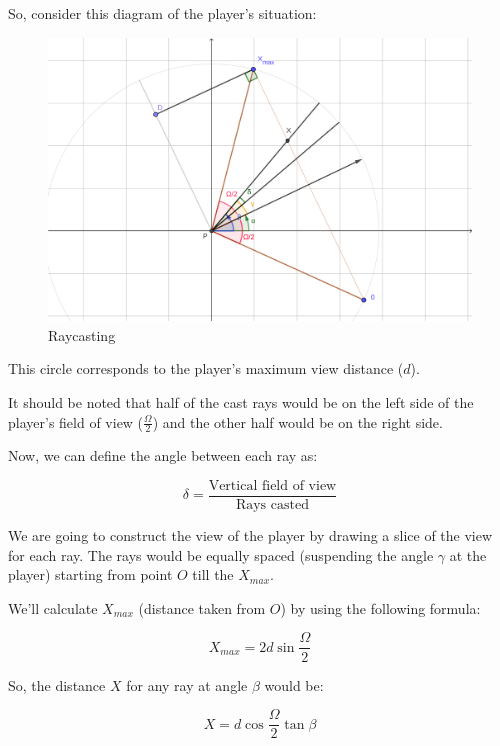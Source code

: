 So, consider this diagram of the player's situation:

\begin{figure}[!ht]
    \centering
    \includegraphics[width=\textwidth]{./images/raycasting.png}
    \caption{Raycasting}
    \label{fig:rays}
\end{figure}

This circle corresponds to the player's maximum view distance ($d$).

It should be noted that half of the cast rays would be on the left side of the player's field of view ($\frac{\Omega}{2}$) and the other half would be on the right side.

Now, we can define the angle between each ray as:

\begin{equation}
    \delta = \frac{\text{Vertical field of view}}{\text{Rays casted}}
\end{equation}

We are going to construct the view of the player by drawing a slice of the view for each ray. The rays would be equally spaced (suspending the angle $\gamma$ at the player) starting from point $O$ till the $X_{max}$.

We'll calculate $X_{max}$ (distance taken from $O$) by using the following formula:

\begin{equation}
    X_{max} = 2 d \sin\frac{\Omega}{2}
\end{equation}

So, the distance $X$ for any ray at angle $\beta$ would be:

\begin{equation}
    X = d \cos\frac{\Omega}{2} \tan\beta
\end{equation}


